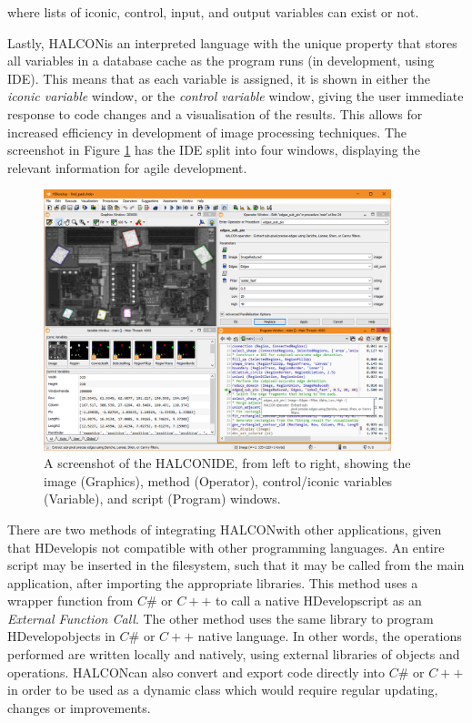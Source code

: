 \documentclass[fleqn,twoside]{article}
\begin{document}
where lists of iconic, control, input, and output variables can exist or not.


Lastly, HALCON\texttrademark is an interpreted language with the unique property that stores all variables in a database cache as the program runs (in development, using IDE). This means that as each variable is assigned, it is shown in either the \textit{iconic variable} window, or the \textit{control variable} window, giving the user immediate response to code changes and a visualisation of the results. This allows for increased efficiency in development of image processing techniques. The screenshot in Figure \ref{fig:halcon_ide} has the IDE split into four windows, displaying the relevant information for agile development.  


\begin{figure}[h]
	\centering
	\includegraphics[width=0.9\textwidth]{halcon_ide.png}
	\caption{A screenshot of the HALCON\texttrademark IDE, from left to right, showing the image (Graphics), method (Operator), control/iconic variables (Variable), and script (Program) windows.}
	\label{fig:halcon_ide}
\end{figure} 


There are two methods of integrating HALCON\texttrademark with other applications, given that HDevelop\texttrademark is not compatible with other programming languages. An entire script may be inserted in the filesystem, such that it may be called from the main application, after importing the appropriate libraries. This method uses a wrapper function from $C\#$ or $C++$ to call a native HDevelop\texttrademark script as an \textit{External Function Call}. The other method uses the same library to program HDevelop\texttrademark objects in $C\#$ or $C++$ native language. In other words, the operations performed are written locally and natively, using external libraries of objects and operations. HALCON\texttrademark can also convert and export code directly into $C\#$ or $C++$ in order to be used as a dynamic class which would require regular updating, changes or improvements.
\end{document}
